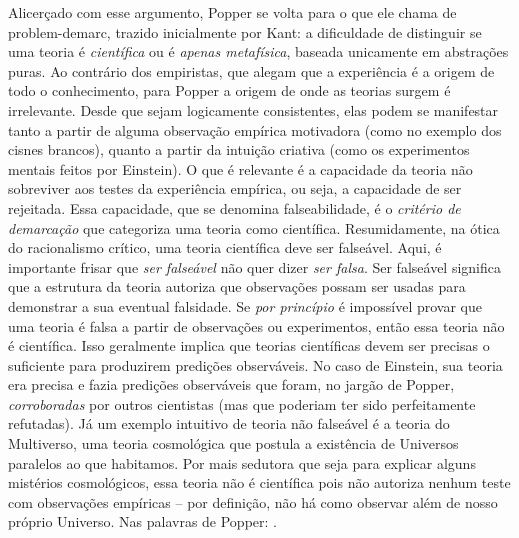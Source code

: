 \documentclass[./main.tex]{subfiles}
\begin{document}
\par Alicerçado com esse argumento, Popper se volta para o que ele chama de \gls{problem-demarc}, trazido inicialmente por Kant: a dificuldade de distinguir se uma teoria é \textit{científica} ou é \textit{apenas metafísica}, baseada unicamente em abstrações puras. Ao contrário dos empiristas, que alegam que a experiência é a origem de todo o conhecimento, para Popper a origem de onde as teorias surgem é irrelevante. Desde que sejam logicamente consistentes, elas podem se manifestar tanto a partir de alguma observação empírica motivadora (como no exemplo dos cisnes brancos), quanto a partir da intuição criativa (como os experimentos mentais feitos por Einstein). O que é relevante é a capacidade da teoria não sobreviver aos testes da experiência empírica, ou seja, a capacidade de ser rejeitada. Essa capacidade, que se denomina \gls{falseabilidade}, é o \textit{critério de demarcação} que categoriza uma teoria como científica. Resumidamente, na ótica do racionalismo crítico, uma teoria científica deve ser falseável. Aqui, é importante frisar que \textit{ser falseável }não quer dizer \textit{ser falsa}. Ser falseável significa que a estrutura da teoria autoriza que observações possam ser usadas para demonstrar a sua eventual falsidade. Se \textit{por princípio} é impossível provar que uma teoria é falsa a partir de observações ou experimentos, então essa teoria não é científica. Isso geralmente implica que teorias científicas devem ser precisas o suficiente para produzirem predições observáveis. No caso de Einstein, sua teoria era precisa e fazia predições observáveis que foram, no jargão de Popper, \textit{corroboradas} por outros cientistas (mas que poderiam ter sido perfeitamente refutadas). Já um exemplo intuitivo de teoria não falseável é a teoria do Multiverso, uma teoria cosmológica que postula a existência de Universos paralelos ao que habitamos. Por mais sedutora que seja para explicar alguns mistérios cosmológicos, essa teoria não é científica pois não autoriza nenhum teste com observações empíricas – por definição, não há como observar além de nosso próprio Universo. Nas palavras de Popper:  \cite{popper2013dois}.
\end{document}
